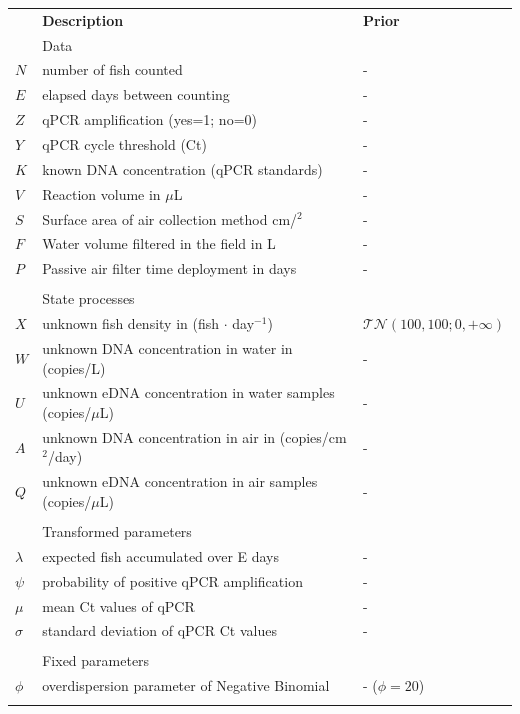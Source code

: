 \documentclass{article}
\begin{document}
\clearpage
    \renewcommand{\thetable}{S1}
\begin{table}[tbhp]
\centering
    \begin{tabular}{lll}
         & \textbf{Description} & \textbf{Prior} \\
&Data & \\
\hline
$N$ & number of fish counted & - \\
$E$ & elapsed days between counting & - \\
$Z$ & qPCR amplification (yes=1; no=0) & - \\
$Y$ & qPCR cycle threshold (Ct) & - \\
$K$ & known DNA concentration (qPCR standards) & - \\
$V$ & Reaction volume in $\mu$L & - \\
$S$ & Surface area of air collection method cm/$^2$ & - \\
$F$&Water volume filtered in the field in L & -\\
$P$&Passive air filter time deployment in days & -\\

&&\\
&State processes&\\
\hline
$X$ & unknown fish density in (fish $\cdot$ day$^{-1}$) & $\mathcal{TN}(100,100;0,+\infty)$ \\
$W$ & unknown DNA concentration in water in (copies/L) & - \\
$U$&unknown eDNA concentration in water samples (copies/$\mu$L) & - \\
$A$ & unknown DNA concentration in air in (copies/cm$^2$/day) & - \\
$Q$ & unknown eDNA concentration in air samples (copies/$\mu$L) & - \\

&&\\

&Transformed parameters&\\
\hline
$\lambda$& expected fish accumulated over E days & - \\
$\psi$& probability of positive qPCR amplification & - \\
$\mu$& mean Ct values of qPCR & - \\
$\sigma$& standard deviation of qPCR Ct values & - \\
&&\\

&Fixed parameters&\\
\hline
$\phi$& overdispersion parameter of Negative Binomial & - ($\phi = 20$) \\
&&\\


\end{tabular}
\end{table}
\end{document}
